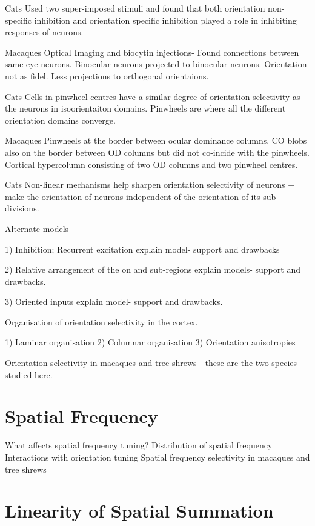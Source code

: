 \cite{Bonds1989} Cats Used two super-imposed stimuli and found that both orientation non-specific inhibition and orientation specific inhibition played a role in inhibiting responses of neurons.

\cite{Malach1993} Macaques Optical Imaging and biocytin injections- Found connections between same eye neurons. Binocular neurons projected to binocular neurons. Orientation not as fidel. Less projections to orthogonal orientaions.

\cite{Maldonado1997} Cats Cells in pinwheel centres have a similar degree of orientation selectivity as the neurons in isoorientaiton domains. Pinwheels are where all the different orientation domains converge.

\cite{Bartfeld1992a} Macaques Pinwheels at the border between ocular dominance columns. CO blobs also on the border between OD columns but did not co-incide with the pinwheels. Cortical hypercolumn consisting of two OD columns and two pinwheel centres. 

\cite{Gardner1999} Cats Non-linear mechanisms help sharpen orientation selectivity of neurons + make the orientation of neurons independent of the orientation of its sub-divisions.

Alternate models

1) Inhibition; Recurrent excitation
explain model- support and drawbacks

2) Relative arrangement of the on and sub-regions
explain models- support and drawbacks.

3) Oriented inputs
explain model- support and drawbacks.


Organisation of orientation selectivity in the cortex.

1) Laminar organisation
2) Columnar organisation
3) Orientation anisotropies

Orientation selectivity in macaques and tree shrews - these are the two species studied here.


\section{Spatial Frequency}

What affects spatial frequency tuning?
Distribution of spatial frequency
Interactions with orientation tuning
Spatial frequency selectivity in macaques and tree shrews

\section{Linearity of Spatial Summation}


